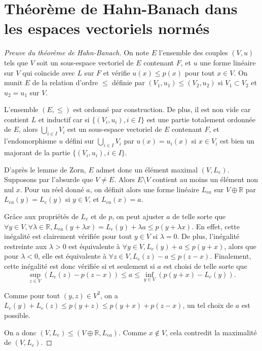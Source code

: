\documentclass{article}
\begin{document}
\section{Théorème de Hahn-Banach dans les espaces vectoriels normés}
\begin{proof}[Preuve du théorème de Hahn-Banach]
    On note $E$ l'ensemble des couples $(V, u)$ tels que $V$ soit un sous-espace vectoriel de $E$ contenant $F$, et $u$ une forme linéaire sur $V$ qui coïncide avec $L$ sur $F$ et vérifie $u(x) \leq p(x)$ pour tout $x \in V$. On munit $E$ de la relation d'ordre $\leq$ définie par $(V_1, u_1) \leq (V_2, u_2)$ si $V_1 \subset V_2$ et $u_2 = u_1$ sur $V$.
    
    L'ensemble $(E, \leq)$ est ordonné par construction. De plus, il est non vide car contient $L$ et inductif car si $\{(V_i, u_i), i \in I\}$ est une partie totalement ordonnée de $E$, alors $\bigcup_{i \in I} V_i$ est un sous-espace vectoriel de $E$ contenant $F$, et l'endomorphisme $u$ défini sur $\bigcup_{i \in I} V_i$ par $u(x) = u_i(x)$ si $x \in V_i$ est bien un majorant de la partie $\{(V_i, u_i), i \in I\}$.
    
    D'après le lemme de Zorn, $E$ admet donc un élément maximal $(V, L_e)$. Supposons par l'absurde que $V \neq E$. Alors $E \setminus V$ contient au moins un élément non nul $x$. Pour un réel donné $a$, on définit alors une forme linéaire $L_{ea}$ sur $V \oplus \mathbb{R}$ par $L_{ea}(y) = L_e(y)$ si $y \in V$, et $L_{ea}(x) = a$.
    
    Grâce aux propriétés de $L_e$ et de $p$, on peut ajuster $a$ de telle sorte que $\forall y \in V, \forall \lambda \in \mathbb{R}, L_{ea}(y + \lambda x) = L_e(y) + \lambda a \leq p(y + \lambda x)$. En effet, cette inégalité est clairement vérifiée pour tout $y \in V$ si $\lambda = 0$. De plus, l'inégalité restreinte aux $\lambda > 0$ est équivalente à $\forall y \in V, L_e(y) + a \leq p(y + x)$, alors que pour $\lambda < 0$, elle est équivalente à $\forall z \in V, L_e(z) - a \leq p(z - x)$. Finalement, cette inégalité est donc vérifiée si et seulement si $a$ est choisi de telle sorte que
    \[
    \sup_{z \in V} (L_e(z) - p(z - x)) \leq a \leq \inf_{y \in V} (p(y + x) - L_e(y)).
    \]
    
    Comme pour tout $(y, z) \in V^2$, on a $L_e(y) + L_e(z) \leq p(y + z) \leq p(y + x) + p(z - x)$, un tel choix de $a$ est possible.
    
    On a donc $(V, L_e) \leq (V \oplus \mathbb{R}, L_{ea})$. Comme $x \notin V$, cela contredit la maximalité de $(V, L_e)$.
    
    \end{proof}
    
\end{document}

